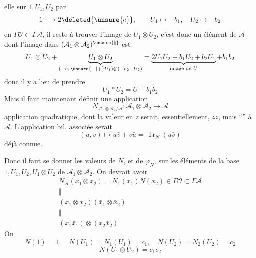 elle  sur $1,U_1,U_2$ par
\[
1\longmapsto2\deleted{\unsure{e}},\qquad U_1\mapsto-b_1,\quad U_2\mapsto-b_2
\]
 en $\Gamma\underline{\mathcal O}\subset\Gamma\mathcal A$, il reste à trouver l'image de $U_1\otimes U_2$, c'est donc un élément de $\mathcal A$ dont l'image dans $(\mathcal A_1\otimes\mathcal A_2)^{\unsure{\natural}}$ est
\[
U_1\otimes U_2+\underbrace{\bar U_1\otimes\bar U_2}_{(-b_1\unsure{-|+}U_1)\otimes(-b_2-U_2)}=\underbrace{2U_1U_2+b_1U_2+b_2U_1}_{\text{image de }U}+b_1b_2
\]
 donc il y a lieu de prendre
\[
U_1*U_2=U+b_1b_2
\]
Mais il faut maintenant définir une application
\[
N_{\mathcal A_1\otimes\mathcal A_2/\mathcal A}:\mathcal A_1\otimes\mathcal A_2\longrightarrow\mathcal A
\]
application quadratique, dont la valeur en $z$ serait, essentiellement, $z\bar z$, mais ``'' à $\mathcal A$.
L'application bil. associée serait
\[
(u,v)\longmapsto u\bar v+v\bar u=\operatorname{Tr}_N(u\bar v)
\]
déjà connue.

Donc il faut se donner les  valeurs de $N$, et de $\varphi_N$, sur les éléments de la base $1,U_1,U_2,U_1\otimes U_2$ de $\mathcal A_1\otimes\mathcal A_2$. On devrait avoir
\[
\begin{array}{c}
N_{\mathcal A}(x_1\otimes x_2)=N_1(x_1)N(x_2)\in\Gamma\mathcal O\subset\Gamma\mathcal A\\
\Vert\\
(x_1\otimes x_2)(\bar x_1\otimes\bar x_2)\\
\Vert\\
(x_1\bar x_1)\otimes(x_2\bar x_2)
\end{array}
\]
On 
\[
N(1)=1,\quad N(U_1)=N_1(U_1)=c_1,\quad N(U_2)=N_2(U_2)=c_2
\]
\[
N(U_1\otimes U_2)=c_1c_2
\]

